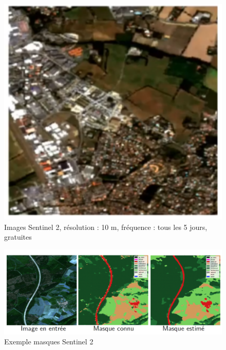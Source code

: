 \documentclass[
  letterpaper,
  DIV=11,
  numbers=noendperiod]{scrreprt}
\begin{document}
\begin{figure}[H]

{\centering \includegraphics{figures/image_sentinel.png}

}

\caption{\label{fig-im-sentinel2}Images Sentinel 2, résolution : 10 m,
fréquence : tous les 5 jours, gratuites}

\end{figure}

\begin{figure}[H]

{\centering \includegraphics{figures/Exemple_1.png}

}

\caption{\label{fig-ex-sentinel2}Exemple masques Sentinel 2}

\end{figure}
\end{document}
